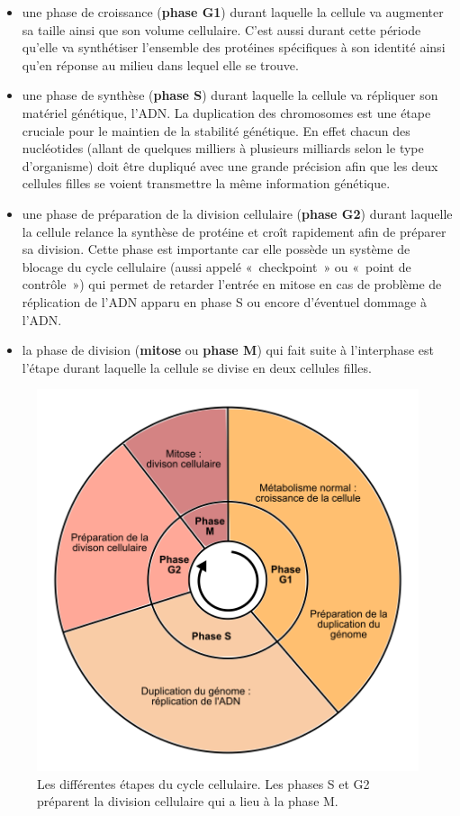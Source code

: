 \documentclass[12pt,a4paper,twoside,openright]{book}
\begin{document}
\begin{itemize}
\item
  une phase de croissance (\textbf{phase G1}) durant laquelle la cellule
  va augmenter sa taille ainsi que son volume cellulaire. C'est aussi
  durant cette période qu'elle va synthétiser l'ensemble des protéines
  spécifiques à son identité ainsi qu'en réponse au milieu dans lequel
  elle se trouve.
\item
  une phase de synthèse (\textbf{phase S}) durant laquelle la cellule va
  répliquer son matériel génétique, l'ADN. La duplication des
  chromosomes est une étape cruciale pour le maintien de la stabilité
  génétique. En effet chacun des nucléotides (allant de quelques
  milliers à plusieurs milliards selon le type d'organisme) doit être
  dupliqué avec une grande précision afin que les deux cellules filles
  se voient transmettre la même information génétique.
\item
  une phase de préparation de la division cellulaire (\textbf{phase G2})
  durant laquelle la cellule relance la synthèse de protéine et croît
  rapidement afin de préparer sa division. Cette phase est importante
  car elle possède un système de blocage du cycle cellulaire (aussi
  appelé «~checkpoint~» ou «~point de contrôle~») qui permet de retarder
  l'entrée en mitose en cas de problème de réplication de l'ADN apparu
  en phase S ou encore d'éventuel dommage à l'ADN.
\item
  la phase de division (\textbf{mitose} ou \textbf{phase M}) qui fait
  suite à l'interphase est l'étape durant laquelle la cellule se divise
  en deux cellules filles.
\end{itemize}

\begin{figure}[htbp]
\centering
\includegraphics{figures/intro/cycle.png}
\caption[Les différentes étapes du cycle cellulaire]{\label{fig:cycle}Les
différentes étapes du cycle cellulaire. Les phases S et G2 préparent la
division cellulaire qui a lieu à la phase M.}
\end{figure}
\end{document}
